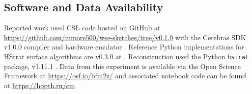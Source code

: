 \subsection{Software and Data Availability}

Reported work used CSL code hosted on GitHub at \url{https://github.com/mmore500/wse-sketches/tree/v0.1.0} \citep{moreno2024wse} with the Cerebras SDK v1.0.0 compiler and hardware emulator \citep{selig2022cerebras}.
Reference Python implementations for HStrat surface algorithms are v0.3.0 at \citep{moreno2024hsurf}.
Reconstruction used the Python \texttt{hstrat} package, v1.11.1 \citep{moreno2022hstrat}.
Data from this experiment is available via the Open Science Framework at \url{https://osf.io/bfm2z/} \citep{moreno2024toward} and associated notebook code can be found at \url{https://hopth.ru/cm}.
